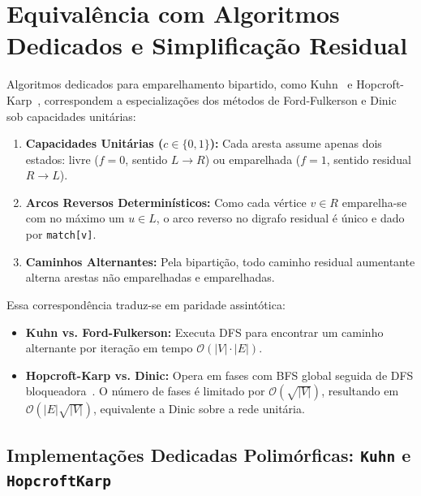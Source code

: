 \section{Equivalência com Algoritmos Dedicados e Simplificação Residual}

Algoritmos dedicados para emparelhamento bipartido, como Kuhn~\cite{kuhn1955hungarian} e Hopcroft-Karp~\cite{korte2018combinatorial}, correspondem a especializações dos métodos de Ford-Fulkerson e Dinic sob capacidades unitárias:

\begin{enumerate}
    \item \textbf{Capacidades Unitárias ($c \in \{0, 1\}$):} Cada aresta assume apenas dois estados: livre ($f = 0$, sentido $L \to R$) ou emparelhada ($f = 1$, sentido residual $R \to L$).
    \item \textbf{Arcos Reversos Determinísticos:} Como cada vértice $v \in R$ emparelha-se com no máximo um $u \in L$, o arco reverso no digrafo residual é único e dado por \lstinline{match[v]}.
    \item \textbf{Caminhos Alternantes:} Pela bipartição, todo caminho residual aumentante alterna arestas não emparelhadas e emparelhadas.
\end{enumerate}

Essa correspondência traduz-se em paridade assintótica:
\begin{itemize}
    \item \textbf{Kuhn vs. Ford-Fulkerson:} Executa DFS para encontrar um caminho alternante por iteração em tempo $\mathcal{O}(|V| \cdot |E|)$.
    \item \textbf{Hopcroft-Karp vs. Dinic:} Opera em fases com BFS global seguida de DFS bloqueadora~\cite{hopcroft1973n52, korte2018combinatorial}. O número de fases é limitado por $\mathcal{O}(\sqrt{|V|})$, resultando em $\mathcal{O}(|E| \sqrt{|V|})$, equivalente a Dinic sobre a rede unitária.
\end{itemize}

\subsection{Implementações Dedicadas Polimórficas: \texttt{Kuhn} e \texttt{HopcroftKarp}}

